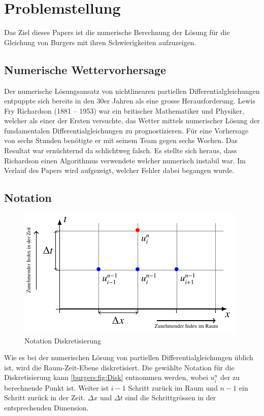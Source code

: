 %
%
\section{Problemstellung
\label{burgers:section:problemstellung}}

	Das Ziel dieses Papers ist die numerische Berechnung der Lösung für die Gleichung von Burgers mit ihren Schwierigkeiten aufzuzeigen.



	\subsection{Numerische Wettervorhersage}
	\label{burgers:sec:nwp}

	Der numerische L\"osungsansatz von nichtlinearen partiellen Differentialgleichungen entpuppte sich bereits in den 30er Jahren als eine grosse Herausforderung.
	Lewis Fry Richardson (1881 -- 1953) war ein britischer Mathematiker und Physiker, welcher als einer der Ersten versuchte, das Wetter mittels numerischer Lösung der fundamentalen Differentialgleichungen zu prognostizieren.
	F\"ur eine Vorhersage von sechs Stunden ben\"otigte er mit seinem Team gegen sechs Wochen.
	Das Resultat war ern\"uchternd da schlichtweg falsch.
	Es stellte sich heraus, dass Richardson einen Algorithmus verwendete welcher numerisch instabil war.
	Im Verlauf des Papers wird aufgezeigt, welcher Fehler dabei begangen wurde.

	\subsection{Notation}

     \begin{figure}
       \centering
       \includegraphics[width=.8\textwidth]{papers/burgers/BurgersEquation/tikz/Gitter/gitter.pdf}
       \caption{Notation Diskretisierung}
       \label{burgers:fig:Disk}
     \end{figure}


     Wie es bei der numerischen L\"osung von partiellen Differentialgleichungen \"ublich ist, wird die Raum-Zeit-Ebene  diskretisiert.
     Die gew\"ahlte Notation f\"ur die Diskretisierung kann \autoref{burgers:fig:Disk} entnommen werden, wobei $u_i^n$ der zu berechnende Punkt ist.
     Weiter ist $i-1$ Schritt zur\"uck im Raum und $n-1$ ein Schritt zur\"uck in der Zeit.
     $\Delta x$ und $\Delta t$ sind die Schrittgr\"ossen in der entsprechenden Dimension.
